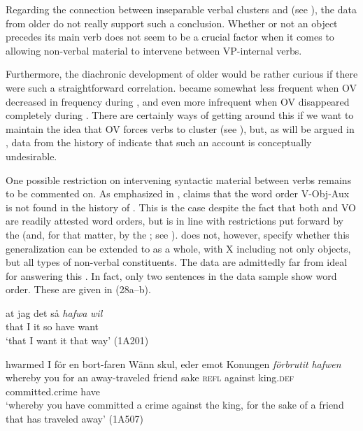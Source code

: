 \documentclass[output=paper, colorlinks, citecolor=brown]{langscibook}
\begin{document}
Regarding the connection between inseparable verbal clusters and  (see \citealt[17–19, 33–35]{Haider2010}), the data from older  do not really support such a conclusion. Whether or not an object precedes its main verb does not seem to be a crucial factor when it comes to allowing non-verbal material to intervene between VP-internal verbs.



Furthermore, the diachronic development of older  would be rather curious if there were such a straightforward correlation.  became somewhat less frequent when OV decreased in frequency during , and even more infrequent when OV disappeared completely during . There are certainly ways of getting around this if we want to maintain the idea that OV forces verbs to cluster (see \cites[290–292]{Haider2010}[132–135]{Haider2013}), but, as will be argued in , data from the history of  indicate that such an account is conceptually undesirable.



One possible restriction on intervening syntactic material between verbs remains to be commented on. As emphasized in , \citet[155, 159]{Petzell2011}  claims that the word order V-Obj-Aux is not found in the history of . This is the case despite the fact that both  and VO are readily attested word orders, but is in line with restrictions put forward by the  (and, for that matter, by the ; see ). \citet{Petzell2011} does not, however, specify whether this generalization can be extended to  as a whole, with X including not only objects, but all types of non-verbal constituents. The  data are admittedly far from ideal for answering this . In fact, only two sentences in the data sample show  word order. These are given in (28a–b).


\ea\label{ex:sangfelt:28}
\ea\label{ex:sangfelt:28a}
\gll at jag det så \textit{hafwa} \textit{wil} \\ %
 that I it so have want\\
\glt ‘that I want it that way’ (1A201)

\ex\label{ex:sangfelt:28b}
\gll hwarmed I {för} {en} {bort-faren} {Wänn} {skul,} {eder} {emot} {Konungen} \textit{förbrutit} \textit{hafwen}\\
 whereby you for an away-traveled friend sake \textsc{refl} against king.\textsc{def} committed.crime have\\
\glt ‘whereby you have committed a crime against the king, for the sake of a friend that has traveled away’ (1A507)
\z 
\z 
\end{document}
